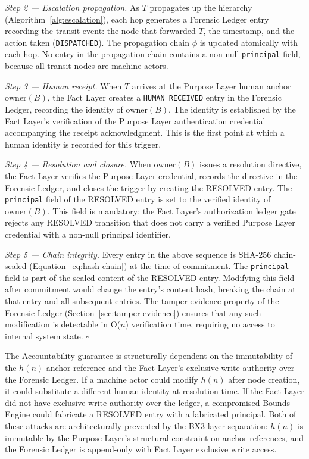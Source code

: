 \medskip

\noindent\textit{Step 2 — Escalation propagation.} As $T$ propagates up the hierarchy (Algorithm~\ref{alg:escalation}), each hop generates a Forensic Ledger entry recording the transit event: the node that forwarded $T$, the timestamp, and the action taken (\texttt{DISPATCHED}). The propagation chain $\phi$ is updated atomically with each hop. No entry in the propagation chain contains a non-null \texttt{principal} field, because all transit nodes are machine actors.

\medskip

\noindent\textit{Step 3 — Human receipt.} When $T$ arrives at the Purpose Layer human anchor $\text{owner}(B)$, the Fact Layer creates a \texttt{HUMAN\_RECEIVED} entry in the Forensic Ledger, recording the identity of $\text{owner}(B)$. The identity is established by the Fact Layer's verification of the Purpose Layer authentication credential accompanying the receipt acknowledgment. This is the first point at which a human identity is recorded for this trigger.

\medskip

\noindent\textit{Step 4 — Resolution and closure.} When $\text{owner}(B)$ issues a resolution directive, the Fact Layer verifies the Purpose Layer credential, records the directive in the Forensic Ledger, and closes the trigger by creating the RESOLVED entry. The \texttt{principal} field of the RESOLVED entry is set to the verified identity of $\text{owner}(B)$. This field is mandatory: the Fact Layer's authorization ledger gate rejects any RESOLVED transition that does not carry a verified Purpose Layer credential with a non-null principal identifier.

\medskip

\noindent\textit{Step 5 — Chain integrity.} Every entry in the above sequence is SHA-256 chain-sealed (Equation~\ref{eq:hash-chain}) at the time of commitment. The \texttt{principal} field is part of the sealed content of the RESOLVED entry. Modifying this field after commitment would change the entry's content hash, breaking the chain at that entry and all subsequent entries. The tamper-evidence property of the Forensic Ledger (Section~\ref{sec:tamper-evidence}) ensures that any such modification is detectable in O($n$) verification time, requiring no access to internal system state. $\square$

\bigskip

The Accountability guarantee is structurally dependent on the immutability of the $h(n)$ anchor reference and the Fact Layer's exclusive write authority over the Forensic Ledger. If a machine actor could modify $h(n)$ after node creation, it could substitute a different human identity at resolution time. If the Fact Layer did not have exclusive write authority over the ledger, a compromised Bounds Engine could fabricate a RESOLVED entry with a fabricated principal. Both of these attacks are architecturally prevented by the BX3 layer separation: $h(n)$ is immutable by the Purpose Layer's structural constraint on anchor references, and the Forensic Ledger is append-only with Fact Layer exclusive write access.

